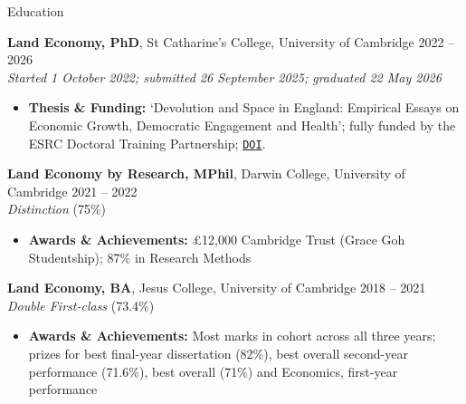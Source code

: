 \documentclass{resume}
\begin{document}
\begin{rSection}{Education}

{\bf Land Economy, PhD}, St Catharine's College, University of Cambridge \hfill {2022 -- 2026}\\
\textit{Started 1 October 2022; submitted 26 September 2025; graduated 22 May 2026} \\
\vspace{-1.5em}
\begin{itemize}
  \itemsep -3pt {} 
  \item \textbf{Thesis \& Funding:} `Devolution and Space in England: Empirical Essays on Economic Growth, Democratic Engagement and Health'; fully funded by the ESRC Doctoral Training Partnership; \href{https://www.repository.cam.ac.uk/items/b8a057d6-9a83-423b-ae1c-a56c1e8a202f}{\nolinkurl{DOI}}.
\end{itemize}

{\bf Land Economy by Research, MPhil}, Darwin College, University of Cambridge \hfill {2021 -- 2022}\\
\textit{Distinction} (75\%)\\
\vspace{-1.5em}
\begin{itemize}
  \itemsep -3pt {} 
  \item \textbf{Awards \& Achievements:} £12,000 Cambridge Trust (Grace Goh Studentship); 87\% in Research Methods
\end{itemize}

{\bf Land Economy, BA}, Jesus College, University of Cambridge \hfill {2018 -- 2021}\\
\textit{Double First-class} (73.4\%) \\
\vspace{-1.5em}
\begin{itemize}
  \itemsep -3pt {} 
  \item \textbf{Awards \& Achievements:} Most marks in cohort across all three years; prizes for best final-year dissertation (82\%), best overall second-year performance (71.6\%), best overall  (71\%) and Economics, first-year performance
\end{itemize}

\end{rSection}
\end{document}
